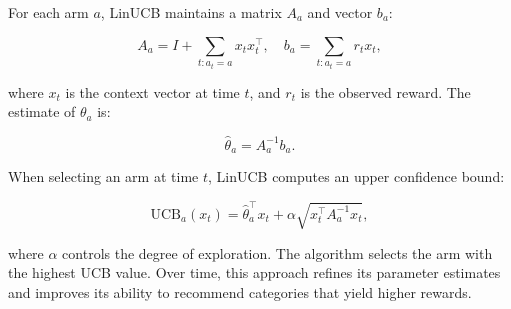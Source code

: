 For each arm \(a\), LinUCB maintains a matrix \(A_a\) and vector \(b_a\):

\[
A_a = I + \sum_{t: a_t = a} x_t x_t^\top, \quad b_a = \sum_{t: a_t = a} r_{t} x_t,
\]

where \(x_t\) is the context vector at time \(t\), and \(r_t\) is the observed reward. The estimate of \(\theta_a\) is:

\[
\hat{\theta}_a = A_a^{-1} b_a.
\]

When selecting an arm at time \(t\), LinUCB computes an upper confidence bound:

\[
\text{UCB}_a(x_t) = \hat{\theta}_a^\top x_t + \alpha \sqrt{x_t^\top A_a^{-1} x_t},
\]

where \(\alpha\) controls the degree of exploration. The algorithm selects the arm with the highest UCB value. Over time, this approach refines its parameter estimates and improves its ability to recommend categories that yield higher rewards.